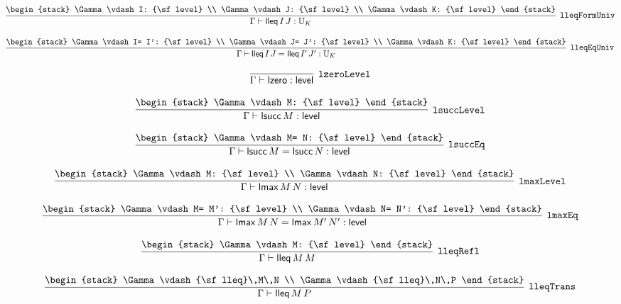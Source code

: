 \[
\infer[{\tt lleqFormUniv}]{\Gamma \vdash {\sf lleq}\,I\,J: {\Bbb U}_{K}}{
\begin{stack}
\Gamma \vdash I: {\sf level}
\\
\Gamma \vdash J: {\sf level}
\\
\Gamma \vdash K: {\sf level}
\end{stack}}
\]

\[
\infer[{\tt lleqEqUniv}]{\Gamma \vdash {\sf lleq}\,I\,J= {\sf lleq}\,I'\,J': {\Bbb U}_{K}}{
\begin{stack}
\Gamma \vdash I= I': {\sf level}
\\
\Gamma \vdash J= J': {\sf level}
\\
\Gamma \vdash K: {\sf level}
\end{stack}}
\]

\[
\infer[{\tt lzeroLevel}]{\Gamma \vdash {\sf lzero}: {\sf level}}{}
\]

\[
\infer[{\tt lsuccLevel}]{\Gamma \vdash {\sf lsucc}\,M: {\sf level}}{
\begin{stack}
\Gamma \vdash M: {\sf level}
\end{stack}}
\]

\[
\infer[{\tt lsuccEq}]{\Gamma \vdash {\sf lsucc}\,M= {\sf lsucc}\,N: {\sf level}}{
\begin{stack}
\Gamma \vdash M= N: {\sf level}
\end{stack}}
\]

\[
\infer[{\tt lmaxLevel}]{\Gamma \vdash {\sf lmax}\,M\,N: {\sf level}}{
\begin{stack}
\Gamma \vdash M: {\sf level}
\\
\Gamma \vdash N: {\sf level}
\end{stack}}
\]

\[
\infer[{\tt lmaxEq}]{\Gamma \vdash {\sf lmax}\,M\,N= {\sf lmax}\,M'\,N': {\sf level}}{
\begin{stack}
\Gamma \vdash M= M': {\sf level}
\\
\Gamma \vdash N= N': {\sf level}
\end{stack}}
\]

\[
\infer[{\tt lleqRefl}]{\Gamma \vdash {\sf lleq}\,M\,M}{
\begin{stack}
\Gamma \vdash M: {\sf level}
\end{stack}}
\]

\[
\infer[{\tt lleqTrans}]{\Gamma \vdash {\sf lleq}\,M\,P}{
\begin{stack}
\Gamma \vdash {\sf lleq}\,M\,N
\\
\Gamma \vdash {\sf lleq}\,N\,P
\end{stack}}
\]

